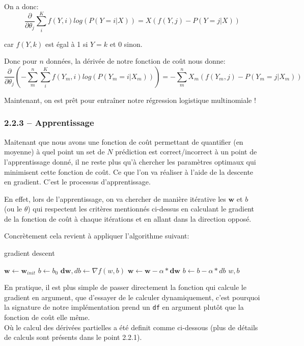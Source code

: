 \documentclass[
]{article}
\begin{document}
On a donc:
\[\frac{\partial}{\partial \theta_{j}} \sum_i^K f(Y, i)log(P(Y = i | X)) = X(f(Y, j) - P(Y = j|X))\]

car \(f(Y, k)\) est égal à 1 si \(Y = k\) et 0 sinon.

Donc pour \(n\) données, la dérivée de notre fonction de coût nous
donne:
\[\frac{\partial}{\partial \theta_{j}} \left( - \sum_m^n \sum_i^K f(Y_m, i)log(P(Y_m = i | X_m))\right) = - \sum_m^n X_m(f(Y_m, j) - P(Y_m = j|X_m))\]

Maintenant, on est prêt pour entraîner notre régression logistique
multinomiale !

\newpage

\hypertarget{apprentissage}{%
\subsubsection{2.2.3 -- Apprentissage}\label{apprentissage}}

Maitenant que nous avons une fonction de coût permettant de quantifier
(en moyenne) à quel point un set de \(N\) prédiction est
correct/incorrect à un point de l'apprentissage donné, il ne reste plus
qu'à chercher les paramètres optimaux qui minimisent cette fonction de
coût. Ce que l'on va réaliser à l'aide de la descente en gradient. C'est
le processus d'apprentissage.

En effet, lors de l'apprentissage, on va chercher de manière itérative
les \(\mathbf{w}\) et \(b\) (ou le \(\theta\)) qui respectent les
critères mentionnés ci-dessus en calculant le gradient de la fonction de
coût à chaque itérations et en allant dans la direction opposé.

Concrètement cela revient à appliquer l'algorithme suivant:

\begin{algorithm}
\caption{gradient descent}\label{alg:grad_desc}
\begin{algorithmic}
\State $\mathbf{w}\gets \mathbf{w}_{init}$
\State $b \gets b_0$
    \State $\mathbf{dw}, db \gets \nabla{f(w, b)} $
    \State $\mathbf{w}\gets \mathbf{w}- \alpha*\mathbf{dw}$
    \State $b \gets b - \alpha*db$
\EndFor
\State \Return $w, b$
\EndFunction
\end{algorithmic}
\end{algorithm}

En pratique, il est plus simple de passer directement la fonction qui
calcule le gradient en argument, que d'essayer de le calculer
dynamiquement, c'est pourquoi la signature de notre implémentation prend
un \texttt{df} en argument plutôt que la fonction de coût elle même.\\
Où le calcul des dérivées partielles a été definit comme ci-dessous
(plus de détails de calculs sont présents dans le point 2.2.1).
\end{document}

